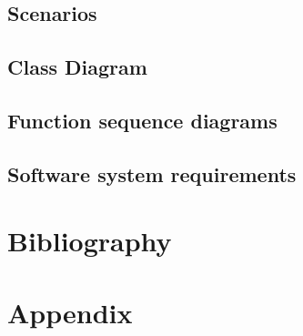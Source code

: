 \documentclass[12pt, a4paper]{article}
\begin{document}
	\subsection{Scenarios}
	
	
	\newpage
	\subsection{Class Diagram}
	
	
	\newpage
	\subsection{Function sequence diagrams}
	
	
	\subsection{Software system requirements}
	

\newpage
\section{Bibliography}
    
    
\section{Appendix}
    
    
\end{document}
